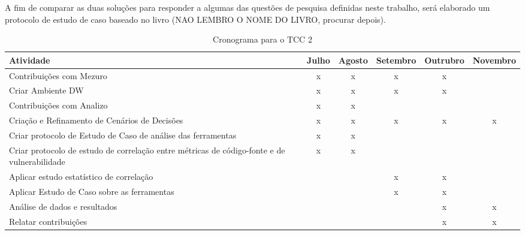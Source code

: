 %

A fim de comparar as duas soluções para responder a algumas das questões de pesquisa definidas neste trabalho, será elaborado um protocolo de estudo de caso baseado no livro (NAO LEMBRO O NOME DO LIVRO, procurar depois). 

	\begin{table}[H]
	\begin{center}
	    \begin{tabular}{ | p{5cm} | c | c |  c |  c |  c |}
	    \hline
	    Atividade & Julho & Agosto & Setembro & Outrubro & Novembro \\ \hline
	    Contribuições com Mezuro & x & x & x & x &  \\ \hline
	    Criar Ambiente DW & x & x & x & x & \\ \hline
	    Contribuições com Analizo & x & x &  &  & \\ \hline
	    Criação e Refinamento de Cenários de Decisões & x & x & x & x & x\\ \hline
	    Criar protocolo de Estudo de Caso de análise das ferramentas & x & x &  &  & \\ \hline
	    Criar protocolo de estudo de correlação entre métricas de código-fonte e de vulnerabilidade & x & x &  &  & \\ \hline
	    Aplicar estudo estatístico de correlação &  &  & x & x & \\ \hline
	    Aplicar Estudo de Caso sobre as ferramentas &  &  & x & x & \\ \hline
	    Análise de dados e resultados &  &  &  & x & x\\ \hline
	    Relatar contribuições &  &  &  & x & x\\ \hline
	    \end{tabular}
	    \caption{Cronograma para o TCC 2}
	    \label{tab:cronograma}
	\end{center}
	\end{table}